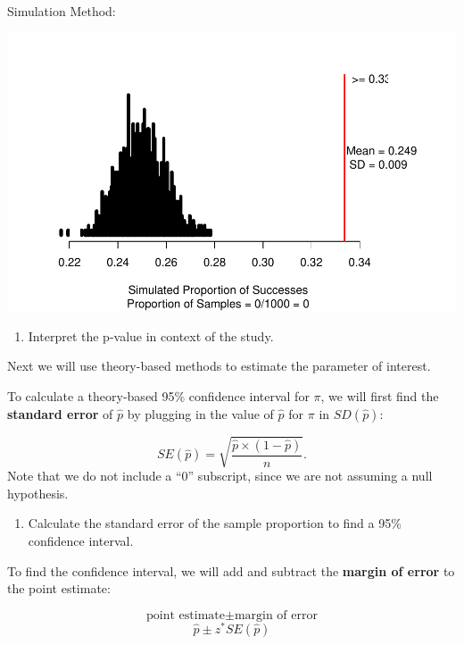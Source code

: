 \documentclass[
]{report}
\providecommand{\tightlist}{%
  \setlength{\itemsep}{0pt}\setlength{\parskip}{0pt}}
\begin{document}
Simulation Method:

\begin{center}\includegraphics[width=0.85\linewidth]{05-UR-module4_review_files/figure-latex/unnamed-chunk-2-1} \end{center}

\begin{enumerate}
\def\labelenumi{\arabic{enumi}.}
\setcounter{enumi}{9}
\tightlist
\item
  Interpret the p-value in context of the study.
\end{enumerate}

\vspace{0.8in}

Next we will use theory-based methods to estimate the parameter of interest.

To calculate a theory-based 95\% confidence interval for \(\pi\), we will first find the \textbf{standard error} of \(\hat{p}\) by plugging in the value of \(\hat{p}\) for \(\pi\) in \(SD(\hat{p})\):

\[SE(\hat{p}) = \sqrt{\frac{\hat{p}\times(1-\hat{p})}{n}}.\]
Note that we do not include a ``0'' subscript, since we are not assuming a null hypothesis.

\begin{enumerate}
\def\labelenumi{\arabic{enumi}.}
\setcounter{enumi}{10}
\tightlist
\item
  Calculate the standard error of the sample proportion to find a 95\% confidence interval.
\end{enumerate}

\vspace{0.5in}

To find the confidence interval, we will add and subtract the \textbf{margin of error} to the point estimate:

\[\text{point estimate}\pm\text{margin of error}\]
\[\hat{p}\pm z^* SE(\hat{p})\]
\end{document}
